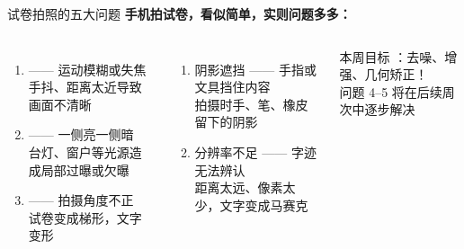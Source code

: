 \begin{frame}{试卷拍照的五大问题}
    \textbf{手机拍试卷，看似简单，实则问题多多：}

    \vspace{0.3cm}

    \begin{columns}[t]
        \begin{enumerate}
            \item[\textbf{1.}]  —— 运动模糊或失焦\\
                {\small 手抖、距离太近导致画面不清晰}
            \vspace{0.2cm}
            \item[\textbf{2.}]  —— 一侧亮一侧暗\\
                {\small 台灯、窗户等光源造成局部过曝或欠曝}
            \vspace{0.2cm}
            \item[\textbf{3.}]  —— 拍摄角度不正\\
                {\small 试卷变成梯形，文字变形}
        \end{enumerate}

        \begin{enumerate}
            \item[\textbf{4.}] 阴影遮挡 —— 手指或文具挡住内容\\
                {\small 拍摄时手、笔、橡皮留下的阴影}
            \vspace{0.2cm}
            \item[\textbf{5.}] 分辨率不足 —— 字迹无法辨认\\
                {\small 距离太远、像素太少，文字变成马赛克}
        \end{enumerate}

        \vspace{0.5cm}
        \begin{alertblock}{本周目标}
            ：去噪、增强、几何矫正！\\
            {\small 问题 4--5 将在后续周次中逐步解决}
        \end{alertblock}
    \end{columns}
\end{frame}

